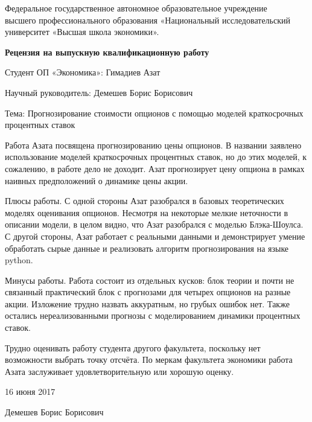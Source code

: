 \documentclass[a4paper, 12pt]{article}
\begin{document}
\begin{center}
{\small Федеральное государственное автономное образовательное учреждение\\ 
высшего профессионального образования «Национальный исследовательский\\ 
университет «Высшая школа экономики».}
\end{center}

\vspace{0.4cm}

\begin{center}
\textbf{Рецензия на выпускную квалификационную работу}
\end{center}

\vspace{0.4cm}

Студент ОП «Экономика»: Гимадиев Азат

\vspace{0.4cm}

Научный руководитель: Демешев Борис Борисович

\vspace{0.4cm}

Тема: Прогнозирование стоимости опционов с помощью моделей краткосрочных
процентных ставок

\vspace{0.4cm}

Работа Азата посвящена прогнозированию цены опционов. В названии
заявлено использование моделей краткосрочных процентных ставок, но до
этих моделей, к сожалению, в работе дело не доходит. Азат прогнозирует
цену опциона в рамках наивных предположений о динамике цены акции.

Плюсы работы. С одной стороны Азат разобрался в базовых теоретических
моделях оценивания опционов. Несмотря на некоторые мелкие неточности в
описании модели, в целом видно, что Азат разобрался с моделью
Блэка-Шоулса. С другой стороны, Азат работает с реальными данными и
демонстрирует умение обработать сырые данные и реализовать алгоритм
прогнозирования на языке python.

Минусы работы. Работа состоит из отдельных кусков: блок теории и почти
не связанный практический блок с прогнозами для четырех опционов на
разные акции. Изложение трудно назвать аккуратным, но грубых ошибок нет.
Также остались нереализованными прогнозы с моделированием динамики
процентных ставок.

Трудно оценивать работу студента другого факультета, поскольку нет
возможности выбрать точку отсчёта. По меркам факультета экономики работа
Азата заслуживает удовлетворительную или хорошую оценку.

\vspace{0.4cm}

16 июня 2017

Демешев Борис Борисович
\end{document}
